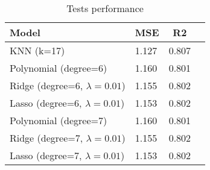 \begin{table}
\centering
\caption{Tests performance}
\label{tab:tests}
\begin{tabular}{|l|l|c|c|}
\toprule
                           Model &   MSE &    R2 \\
\midrule
                      KNN (k=17) & 1.127 & 0.807 \\
           Polynomial (degree=6) & 1.160 & 0.801 \\
Ridge (degree=6, $\lambda=0.01$) & 1.155 & 0.802 \\
Lasso (degree=6, $\lambda=0.01$) & 1.153 & 0.802 \\
           Polynomial (degree=7) & 1.160 & 0.801 \\
Ridge (degree=7, $\lambda=0.01$) & 1.155 & 0.802 \\
Lasso (degree=7, $\lambda=0.01$) & 1.153 & 0.802 \\
\bottomrule
\end{tabular}
\end{table}
